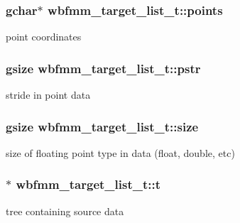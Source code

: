 \subsubsection[{points}]{\setlength{\rightskip}{0pt plus 5cm}gchar$\ast$ wbfmm\+\_\+target\+\_\+list\+\_\+t\+::points}\label{structwbfmm__target__list__t_a506b4f5c246ffeaa63579dd0599f4982}
point coordinates 
\subsubsection[{pstr}]{\setlength{\rightskip}{0pt plus 5cm}gsize wbfmm\+\_\+target\+\_\+list\+\_\+t\+::pstr}\label{structwbfmm__target__list__t_a85ad22089280c197357287a78b2c5ef2}
stride in point data 
\subsubsection[{size}]{\setlength{\rightskip}{0pt plus 5cm}gsize wbfmm\+\_\+target\+\_\+list\+\_\+t\+::size}\label{structwbfmm__target__list__t_a8a3765da21d5bc65aecdb430dba04af0}
size of floating point type in data (float, double, etc) 
\subsubsection[{t}]{$\ast$ wbfmm\+\_\+target\+\_\+list\+\_\+t\+::t}\label{structwbfmm__target__list__t_a329c6de7e15dc5a69c7cb8fa6ee1ae5a}
tree containing source data 
